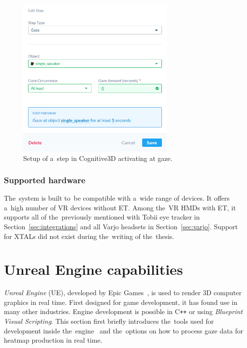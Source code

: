 \begin{figure}[!t]\centering
    \includegraphics[width=0.7\textwidth]{img/cognitive3D-objective.png}
    \caption[Setup of a~step in Cognitive3D that activates at gaze.]{Setup of a~step in Cognitive3D activating at gaze.~\cite{cognitive3d-objectives}}
    \label{fig:cog3d-obj}
\end{figure}

\subsubsection*{Supported hardware}
The~system is built to~be compatible with a~wide range of devices. It offers a~high number of VR devices without ET. Among the~VR HMDs with ET, it supports all of the~previously mentioned with Tobii eye tracker in Section~\ref{sec:integrations} and all Varjo headsets in Section~\ref{sec:varjo}. Support for XTALs did not exist during the~writing of the~thesis.

\section{Unreal Engine capabilities}

\emph{Unreal Engine} (UE), developed by Epic Games~\cite{unreal-engine}, is used to render 3D computer graphics in real time. First designed for game development, it has found use in many other industries. Engine development is possible in C\texttt{++} or using \emph{Blueprint Visual Scripting}. This section first briefly introduces the~tools used for development inside the~engine~\cite{unreal-documentation} and the~options on how to process gaze data for heatmap production in real time.

